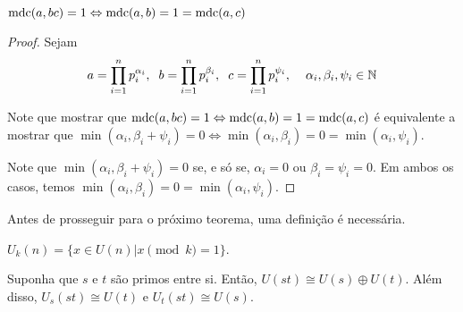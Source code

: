 	\begin{lemma}
		\label{lema2}
		$\operatorname{mdc}(a,bc) = 1 \Leftrightarrow \operatorname{mdc}(a,b) = 1 = \operatorname{mdc}(a,c)$ 
		
	\end{lemma}
	
	\begin{proof}
		Sejam 
		\begin{align*}
		a = \prod_{i = 1}^{n}p_i^{\alpha_i},\hspace{0.2cm}
		b = \prod_{i = 1}^{n}p_i^{\beta_i}, \hspace{0.2cm}
		c = \prod_{i = 1}^{n}p_i^{\psi_i}, \hspace{0.4cm}\alpha_i, \beta_i, \psi_i\in\mathbb{N}
		\end{align*}
		\par\vspace{0.3cm} Note que mostrar que $\operatorname{mdc}(a,bc) = 1 \Leftrightarrow \operatorname{mdc}(a,b) = 1 = \operatorname{mdc}(a,c)$ é equivalente a mostrar que $\min(\alpha_i, \beta_i + \psi_i) = 0 \Leftrightarrow \min(\alpha_i, \beta_i) = 0 = \min(\alpha_i, \psi_i)$.
		\par\vspace{0.3cm} Note que $\min(\alpha_i, \beta_i + \psi_i) = 0$ se, e só se, $\alpha_i = 0$ ou $\beta_i = \psi_i = 0$. Em ambos os casos, temos $\min(\alpha_i, \beta_i) = 0 = \min(\alpha_i, \psi_i)$.
		
	\end{proof}
	\par\vspace{0.3cm} Antes de prosseguir para o próximo teorema, uma definição é necessária.
	\begin{deff}
		\label{def U_k(n)}
		$U_k(n) = \{x\in U(n)|x\pmod k = 1 \}$.
	\end{deff}
	
	\begin{theorem}
		\label{produto direto}
		Suponha que $s$ e $t$ são primos entre si. Então, $U(st)\cong U(s)\oplus U(t)$. Além disso, $U_s(st)\cong U(t)$ e $U_t(st)\cong U(s).$
	\end{theorem}
	
